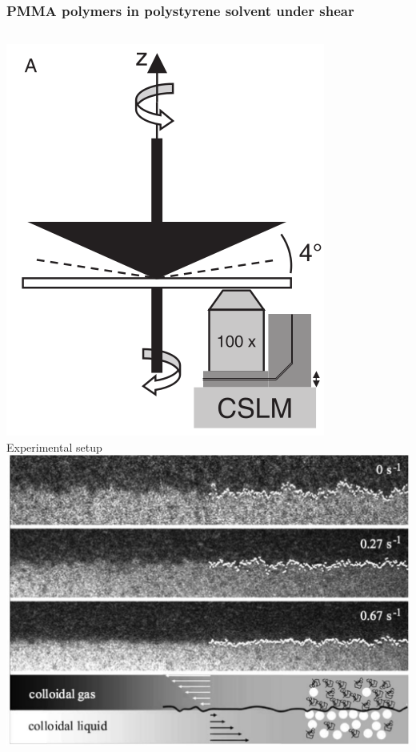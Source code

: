 \documentclass[9pt, dvipsnames,aspectratio=169]{beamer} %
\begin{document}
\begin{frame}
    \frametitle{PMMA polymers in polystyrene solvent under shear \newline [Derks et al. 2004+2006]}
    \begin{overprint}
    	\centering
	    \begin{columns}
	    \includegraphics[width=\linewidth]{derks-setups.png} \\
    	\centering	    
	    Experimental setup 
	    \includegraphics[width=\linewidth]{derks.png}  \\

\end{columns}
\end{overprint}
\end{frame}
\end{document}
